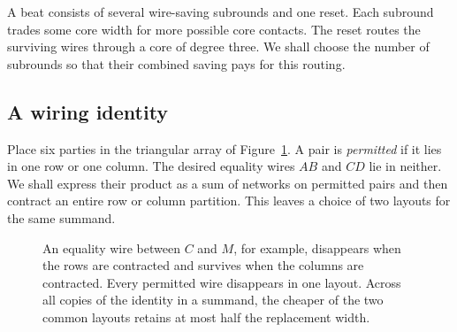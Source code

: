 A beat consists of several wire-saving subrounds and one reset. Each
subround trades some core width for more possible core contacts. The
reset routes the surviving wires through a core of degree three. We
shall choose the number of subrounds so that their combined saving
pays for this routing.

\subsection{A wiring identity}
Place six parties in the triangular array of Figure~\ref{fig:two-layouts}.
A pair is \emph{permitted} if it lies in one row or one column. The
desired equality wires \(AB\) and \(CD\) lie in neither. We shall express
their product as a sum of networks on permitted pairs and then contract
an entire row or column partition. This leaves a choice of two layouts
for the same summand.

\begin{figure}[htb]
\centering
{}
\caption{An equality wire between \(C\) and \(M\), for example, disappears
when the rows are contracted and survives when the columns are contracted.
Every permitted wire disappears in one layout. Across all copies of the
identity in a summand, the cheaper of the two common layouts retains at
most half the replacement width.}
\label{fig:two-layouts}
\end{figure}

